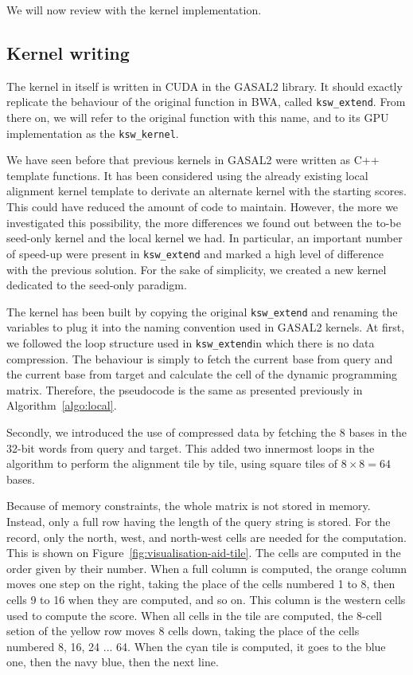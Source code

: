 We will now review with the kernel implementation.

\subsection{Kernel writing}
The kernel in itself is written in CUDA in the GASAL2 library. It should exactly replicate the behaviour of the original function in BWA, called \verb|ksw_extend|. From there on, we will refer to the original function with this name, and to its GPU implementation as the \verb|ksw_kernel|.

We have seen before that previous kernels in GASAL2 were written as C++ template functions. It has been considered using the already existing local alignment kernel template to derivate an alternate kernel with the starting scores. This could have reduced the amount of code to maintain. However, the more we investigated this possibility, the more differences we found out between the to-be seed-only kernel and the local kernel we had. In particular, an important number of speed-up were present in \verb|ksw_extend| and marked a high level of difference with the previous solution. For the sake of simplicity, we created a new kernel dedicated to the seed-only paradigm.

The kernel has been built by copying the original \verb|ksw_extend| and renaming the variables to plug it into the naming convention used in GASAL2 kernels. At first, we followed the loop structure used in \verb|ksw_extend|in which there is no data compression. The behaviour is simply to fetch the current base from query and the current base from target and calculate the cell of the dynamic programming matrix. Therefore, the pseudocode is the same as presented previously in Algorithm~\ref{algo:local}.

Secondly, we introduced the use of compressed data by fetching the 8 bases in the 32-bit words from query and target. This added two innermost loops in the algorithm to perform the alignment tile by tile, using square tiles of $8 \times 8 = 64$ bases.

Because of memory constraints, the whole matrix is not stored in memory. Instead, only a full row having the length of the query string is stored. For the record, only the north, west, and north-west cells are needed for the computation. This is shown on Figure~\ref{fig:visualisation-aid-tile}. The cells are computed in the order given by their number. When a full column is computed, the orange column moves one step on the right, taking the place of the cells numbered 1 to 8, then cells 9 to 16 when they are computed, and so on. This column is the western cells used to compute the score. When all cells in the tile are computed, the 8-cell setion of the yellow row moves 8 cells down, taking the place of the cells numbered 8, 16, 24 ... 64. When the cyan tile is computed, it goes to the blue one, then the navy blue, then the next line.


